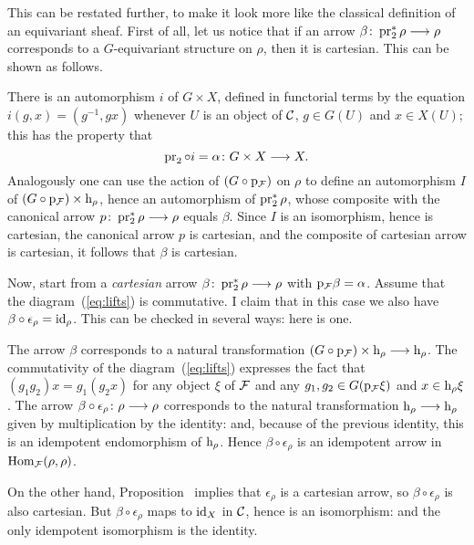 \begin{3   FIBERED CATEGORIES}
\begin{3.8 Equivariant objects in fibcats}
\begin{proposition}
\end{proposition}

This can be restated further, to make it look more like the classical definition of an equivariant sheaf. First of all, let us notice that if an arrow $\beta \colon \pr_2^*\rho \arr \rho$ corresponds to a $G$-equivariant structure on $\rho$, then it is cartesian. This can be shown as follows. 

There is an automorphism $i$ of $G \times X$, defined in functorial terms by the equation $i(g,x) = (g^{-1}, gx)$ whenever $U$ is an object of $\mathcal{C}$, $g \in G(U)$ and $x \in X(U)$; this has the property that 
   \[
   \pr_{2} \circ i = \alpha \colon G \times X \arr X.
   \]
Analogously one can use the action of $(G \circ \mathrm{p}_{\mathcal{F}})$ on $\rho$ to define an automorphism $I$ of $(G \circ \mathrm{p}_{\mathcal{F}}) \times \mathrm{h}_\rho$, hence an automorphism of $\operatorname{pr}_{2}^{*}\rho$, whose composite with the canonical arrow $p \colon \pr_{2}^{*}\rho \arr \rho$ equals $\beta$. Since $I$ is an isomorphism, hence is cartesian, the canonical arrow $p$ is cartesian, and the composite of cartesian arrow is cartesian, it follows that $\beta$ is cartesian.

Now, start from a \emph{cartesian} arrow $\beta \colon \pr_{2}^{*} \rho \arr \rho$ with $\mathrm{p}_{\mathcal{F}}\beta = \alpha$. Assume that the diagram~(\ref{eq:lifts}) is commutative. I claim that in this case we also have $\beta \circ \epsilon_{\rho} = \mathrm{id}_{\rho}$. This can be checked in several ways: here is one.

The arrow $\beta$ corresponds to a natural transformation $(G \circ \p_{\cF}) \times \h_{\rho} \arr \h_{\rho}$. The commutativity of the diagram~(\ref{eq:lifts}) expresses the fact that $(g_{1}g_{2})x = g_{1}(g_{2}x)$ for any object $\xi$ of $\mathcal{F}$ and any $g_{1}, g_{2} \in G(\mathrm{p}_{\mathcal{F}}\xi)$ and $x \in \mathrm{h}_{\rho}\xi$.  The arrow $\beta \circ \epsilon_{\rho} \colon \rho \arr \rho$ corresponds to the natural transformation $\h_{\rho} \arr \h_{\rho}$ given by multiplication by the identity: and, because of the previous identity, this is an idempotent endomorphism of $\mathrm{h}_{\rho}$. Hence $\beta \circ \epsilon_{\rho}$ is an idempotent arrow in $\operatorname{Hom}_{\mathcal{F}}(\rho, \rho)$.

On the other hand, Proposition~ implies that $\epsilon_{\rho}$ is a cartesian arrow, so $\beta \circ \epsilon_{\rho}$ is also cartesian. But $\beta \circ \epsilon_{\rho}$ maps to $\mathrm{id}_{X}$ in $\mathcal{C}$, hence is an isomorphism: and the only idempotent isomorphism is the identity.


\end{3.8 Equivariant objects in fibcats}
\end{3   FIBERED CATEGORIES}
